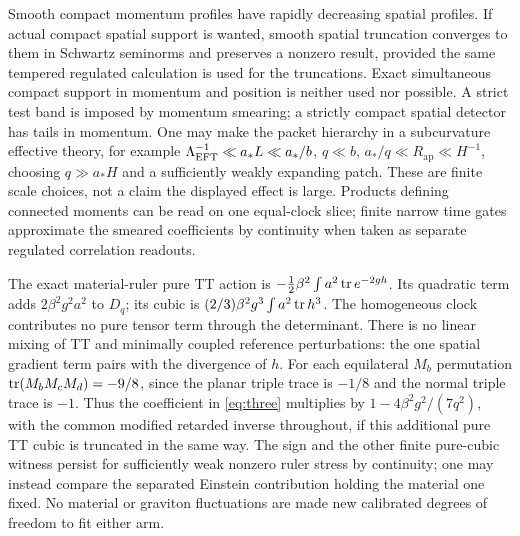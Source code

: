 Smooth compact momentum profiles have rapidly decreasing spatial profiles. If actual compact spatial support is wanted, smooth spatial truncation converges to them in Schwartz seminorms and preserves a nonzero result, provided the same tempered regulated calculation is used for the truncations. Exact simultaneous compact support in momentum and position is neither used nor possible. A strict test band is imposed by momentum smearing; a strictly compact spatial detector has tails in momentum. One may make the packet hierarchy in a subcurvature effective theory, for example \(\Lambda_{\rm EFT}^{-1}\ll a_*L\ll a_*/b\), \(q\ll b\), \(a_*/q\ll R_{\mathrm{ap}}\ll H^{-1}\), choosing \(q\gg a_* H\) and a sufficiently weakly expanding patch. These are finite scale choices, not a claim the displayed effect is large. Products defining connected moments can be read on one equal-clock slice; finite narrow time gates approximate the smeared coefficients by continuity when taken as separate regulated correlation readouts.

The exact material-ruler pure TT action is
\(-\frac12\beta^2\int a^2\operatorname{tr} e^{-2gh}\).
Its quadratic term adds \(2\beta^2g^2 a^2\) to \(D_q\); its cubic is \((2/3)\beta^2g^3\int a^2\operatorname{tr} h^3\). The homogeneous clock contributes no pure tensor term through the determinant. There is no linear mixing of TT and minimally coupled reference perturbations: the one spatial gradient term pairs with the divergence of \(h\). For each equilateral \(M_b\) permutation \(\operatorname{tr}(M_bM_cM_d)=-9/8\), since the planar triple trace is \(-1/8\) and the normal triple trace is \(-1\). Thus the coefficient in \eqref{eq:three} multiplies by \(1-4\beta^2g^2/(7q^2)\), with the common modified retarded inverse throughout, if this additional pure TT cubic is truncated in the same way. The sign and the other finite pure-cubic witness persist for sufficiently weak nonzero ruler stress by continuity; one may instead compare the separated Einstein contribution holding the material one fixed. No material or graviton fluctuations are made new calibrated degrees of freedom to fit either arm.
